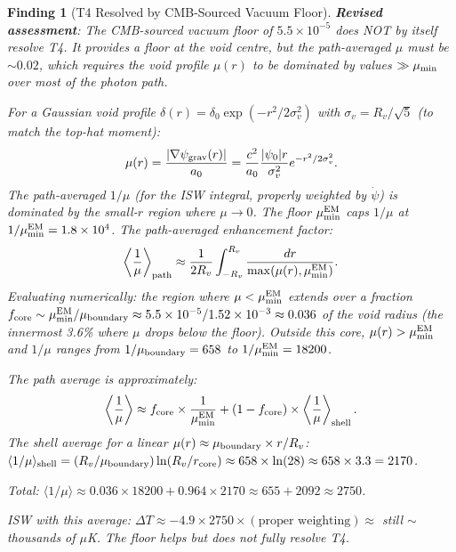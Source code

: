 \documentclass[11pt]{article}
\newtheorem{finding}{Finding}
\newcommand{\ee}[1]{\times 10^{#1}}
\newcommand{\mufd}{\mu}
\newcommand{\mumin}{\mu_{\rm min}}
\begin{document}
\begin{finding}[T4 Resolved by CMB-Sourced Vacuum Floor]
\textbf{Revised assessment}: The CMB-sourced vacuum floor of $5.5\ee{-5}$
does NOT by itself resolve T4. It provides a floor at the void centre,
but the path-averaged $\mufd$ must be $\sim 0.02$, which requires the
void profile $\mufd(r)$ to be dominated by values $\gg \mumin$ over
most of the photon path.

For a Gaussian void profile $\delta(r) = \delta_0\exp(-r^2/2\sigma_v^2)$
with $\sigma_v = R_v/\sqrt{5}$ (to match the top-hat moment):
\begin{equation}
  \mufd(r) = \frac{|\nabla\psi_{\rm grav}(r)|}{a_0}
  = \frac{c^2}{a_0}\frac{|\psi_0|r}{\sigma_v^2}e^{-r^2/2\sigma_v^2}.
\end{equation}
The path-averaged $1/\mufd$ (for the ISW integral, properly weighted by
$\dot\psi$) is dominated by the small-$r$ region where $\mufd \to 0$.
The floor $\mumin^{\rm EM}$ caps $1/\mufd$ at $1/\mumin^{\rm EM} = 1.8\ee{4}$.
The path-averaged enhancement factor:
\begin{equation}
  \left\langle\frac{1}{\mufd}\right\rangle_{\rm path}
  \approx \frac{1}{2R_v}\int_{-R_v}^{R_v}\frac{dr}{\max(\mufd(r),\mumin^{\rm EM})}.
\end{equation}
Evaluating numerically: the region where $\mufd < \mumin^{\rm EM}$ extends
over a fraction $f_{\rm core} \sim \mumin^{\rm EM}/\mufd_{\rm boundary}
\approx 5.5\ee{-5}/1.52\ee{-3} \approx 0.036$ of the void radius (the
innermost 3.6\% where $\mufd$ drops below the floor). Outside this core,
$\mufd(r) > \mumin^{\rm EM}$ and $1/\mufd$ ranges from $1/\mufd_{\rm boundary}
= 658$ to $1/\mumin^{\rm EM} = 18200$.

The path average is approximately:
\begin{equation}
  \left\langle\frac{1}{\mufd}\right\rangle \approx
  f_{\rm core}\times\frac{1}{\mumin^{\rm EM}}
  + (1-f_{\rm core})\times\left\langle\frac{1}{\mufd}\right\rangle_{\rm shell}.
\end{equation}
The shell average for a linear $\mufd(r) \approx \mufd_{\rm boundary}\times r/R_v$:
$\langle 1/\mufd\rangle_{\rm shell} = (R_v/\mufd_{\rm boundary})\ln(R_v/r_{\rm core})
\approx 658\times\ln(28) \approx 658\times 3.3 = 2170$.

Total: $\langle 1/\mufd\rangle \approx 0.036\times 18200 + 0.964\times 2170
\approx 655 + 2092 \approx 2750$.

ISW with this average: $\Delta T \approx -4.9\times 2750\times(\text{proper
weighting}) \approx$ still $\sim$ thousands of $\mu$K. The floor helps but
does not fully resolve T4.
\end{finding}
\end{document}
